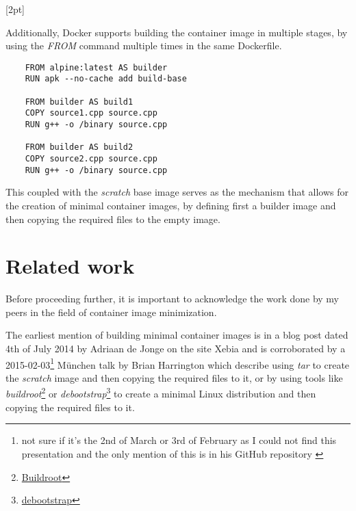 [2pt]

Additionally, Docker supports building the container image in multiple stages, by using the \textit{FROM} command multiple times in the same Dockerfile.



\lstset{language=Dockerfile,caption=Sample Multi-stage Dockerfile,label=lst:ex-multi-stage-dockerifle}
\begin{lstlisting}
    FROM alpine:latest AS builder
    RUN apk --no-cache add build-base
    
    FROM builder AS build1
    COPY source1.cpp source.cpp
    RUN g++ -o /binary source.cpp
    
    FROM builder AS build2
    COPY source2.cpp source.cpp
    RUN g++ -o /binary source.cpp   
\end{lstlisting}

This coupled with the \textit{scratch} base image serves as the mechanism that allows for the creation of minimal container images, by defining first a 
builder image and then copying the required files to the empty image.

\section{Related work}
\label{sec:related-work}

Before proceeding further, it is important to acknowledge the work done by 
my peers in the field of container image minimization.

The earliest mention of building minimal container images is in a blog post dated 4th of July 2014 by
Adriaan de Jonge on the site Xebia \cite{xebia-post} and is corroborated by a 
2015-02-03\footnote{not sure if it's the 2nd of March or 3rd of February as I could not find this presentation and the only mention of this is in his GitHub repository \cite{minimal-containers-101}} München talk by Brian Harrington \cite{minimal-containers-101}
which describe using \textit{tar} to create the \textit{scratch} image and then copying the required files to it, or by using 
tools like \textit{buildroot}\footnote{\href{https://buildroot.org/}{Buildroot}} or \textit{debootstrap}\footnote{\href{https://wiki.debian.org/Debootstrap}{debootstrap}} to create a minimal Linux distribution and then copying the required files to it.

